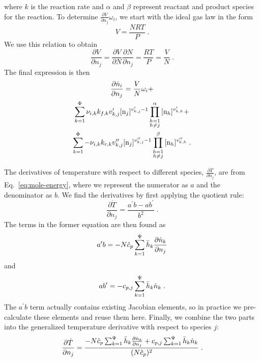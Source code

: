 \documentclass[twocolumn,10pt]{article} %
\begin{document}
where $k$ is the reaction rate and $\alpha$ and $\beta$ represent reactant and product species for the reaction.
To determine $\frac{\partial V}{\partial n_j} \omega_i$, we start with the ideal gas law in the form
\begin{equation}
     V = \frac{NRT}{P} \;.
\end{equation}
We use this relation to obtain
\begin{equation}
    \frac{\partial V}{\partial n_j} = \frac{\partial V}{\partial N}\frac{\partial N}{\partial n_j} = \frac{RT}{P} = \frac{V}{N} \;.
\end{equation}
The final expression is then
\begin{multline}
    \frac{\partial \dot{n}_i}{\partial n_j} = \frac{V}{N} \omega_i + \\
    \ReacSum{\nu_{i,k} k_{f,k}{v_{k,j}^\prime} \conc{n_j}^{v_{k,j}^\prime-1}\ReactSpecProd{\conc{n_h}^{v_{k,h}^\prime}}} + \\
    \ReacSum{-\nu_{i,k} k_{r,k}v_{k,j}^{\prime\prime}\conc{n_j}^{v_{k,j}^{\prime\prime}-1}\ProdSpecProd{\conc{n_h}^{v_{k,h}^{\prime\prime}}}} \;.
\end{multline}
%
%

The derivatives of temperature with respect to different species, $\frac{\partial\dot{T}}{\partial n_j}$, are from Eq.~\eqref{eq:mole-energy}, where we represent the numerator as $a$ and the denominator as $b$.
We find the derivatives by first applying the quotient rule:
\begin{equation}
    \frac{\partial \dot{T}}{\partial n_j} = \frac{a^\prime b - ab^\prime}{b^2} \;.
\end{equation}
The terms in the former equation are then found as
\begin{equation}
    a^\prime b = -N\hat{c}_p\sum_{k=1}^{\Psi}{\bar{h}_k \frac{\partial \dot{n}_k}{\partial n_j}}
\end{equation}
and
\begin{equation}
    a b^\prime = -c_{p,j}\sum_{k=1}^{\Psi}{\bar{h}_k \dot{n}_k} \;.
\end{equation}
The $a^\prime b$ term actually contains existing Jacobian elements, so in practice we pre-calculate these elements and reuse them here.
Finally, we combine the two parts into the generalized temperature derivative with respect to species $j$:
\begin{equation}
    \label{eq:temp-species}
    \frac{\partial \dot{T}}{\partial n_j} = \frac{-N\hat{c}_p\sum_{k=1}^{\Psi}{\bar{h}_k \frac{\partial \dot{n}_k}{\partial n_j}} + c_{p,j}\sum_{k=1}^{\Psi}{\bar{h}_k \dot{n}_k}}{(N\hat{c}_p)^2} \;.
\end{equation}
\end{document}
